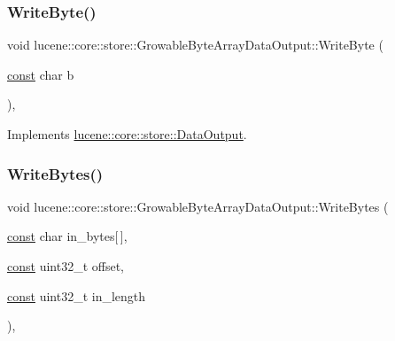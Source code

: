 \mbox{\label{classlucene_1_1core_1_1store_1_1GrowableByteArrayDataOutput_acc15bef7c843270e142e935348fa5583}} 
\subsubsection{\texorpdfstring{Write\+Byte()}{WriteByte()}}
{\footnotesize\ttfamily void lucene\+::core\+::store\+::\+Growable\+Byte\+Array\+Data\+Output\+::\+Write\+Byte (\begin{DoxyParamCaption}\item[{\mbox{\hyperlink{ZlibCrc32_8h_a2c212835823e3c54a8ab6d95c652660e}{const}} char}]{b }\end{DoxyParamCaption})\hspace{0.3cm}{\ttfamily [inline]}, {\ttfamily [virtual]}}



Implements \mbox{\hyperlink{classlucene_1_1core_1_1store_1_1DataOutput_a22e242cc11ebfc3e7937eacb07106626}{lucene\+::core\+::store\+::\+Data\+Output}}.

\mbox{\label{classlucene_1_1core_1_1store_1_1GrowableByteArrayDataOutput_ade5509d15287b0b7a70a50b8ebad79d1}} 
\subsubsection{\texorpdfstring{Write\+Bytes()}{WriteBytes()}}
{\footnotesize\ttfamily void lucene\+::core\+::store\+::\+Growable\+Byte\+Array\+Data\+Output\+::\+Write\+Bytes (\begin{DoxyParamCaption}\item[{\mbox{\hyperlink{ZlibCrc32_8h_a2c212835823e3c54a8ab6d95c652660e}{const}} char}]{in\+\_\+bytes\mbox{[}$\,$\mbox{]},  }\item[{\mbox{\hyperlink{ZlibCrc32_8h_a2c212835823e3c54a8ab6d95c652660e}{const}} uint32\+\_\+t}]{offset,  }\item[{\mbox{\hyperlink{ZlibCrc32_8h_a2c212835823e3c54a8ab6d95c652660e}{const}} uint32\+\_\+t}]{in\+\_\+length }\end{DoxyParamCaption})\hspace{0.3cm}{\ttfamily [inline]}, {\ttfamily [virtual]}}



